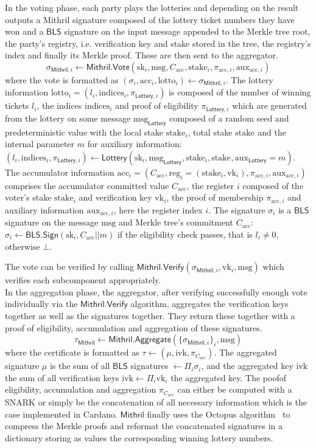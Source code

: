 \documentclass{article}
\newcommand{\vk}[1]{\ensuremath{\textrm{vk}_{#1}}\xspace}
\newcommand{\sk}[1]{\ensuremath{\textrm{sk}_{#1}}\xspace}
\newcommand{\m}{\ensuremath{\textrm{msg}}\xspace}
\newcommand{\acc}{\ensuremath{\textrm{acc}}\xspace}
\newcommand{\aux}{\ensuremath{\textrm{aux}}\xspace}
\newcommand{\reg}[1]{\ensuremath{\textrm{reg}_{#1}}\xspace}
\newcommand{\stake}[1]{\ensuremath{\textrm{stake}_{#1}}\xspace}
\newcommand{\lotto}[1]{\ensuremath{\textrm{lotto}_{#1}}\xspace}
\newcommand{\indices}[1]{\ensuremath{\textrm{indices}_{#1}}\xspace}
\newcommand{\ivk}{\ensuremath{\textrm{ivk}}\xspace}
\newcommand{\BLS}{\ensuremath{\mathsf{BLS}}\xspace}
\newcommand{\Mithril}{\ensuremath{\mathsf{Mithril}}\xspace}
\newcommand{\Lottery}{\ensuremath{\mathsf{Lottery}}\xspace}
\newcommand{\Vote}{\ensuremath{\mathsf{Vote}}\xspace}
\newcommand{\Sign}{\ensuremath{\mathsf{Sign}}\xspace}
\newcommand{\Verify}{\ensuremath{\mathsf{Verify}}\xspace}
\newcommand{\Aggregate}{\ensuremath{\mathsf{Aggregate}}\xspace}
\begin{document}
In the voting phase, each party plays the lotteries and depending on the result outputs a Mithril signature composed of the lottery ticket numbers they have won and a \BLS signature on the input message appended to the Merkle tree root, the party's registry, i.e. verification key and stake stored in the tree, the registry's index and finally its Merkle proof. These are then sent to the aggregator.
$$
\sigma_{\Mithril, i} \leftarrow \Mithril.\Vote(\sk{i}, \m, C_\acc, \stake{i}, \pi_{\acc, i}, \aux_{\acc, i})
$$
where the vote is formatted as $(\sigma_i, \acc_i, \lotto{i}) \leftarrow \sigma_{\Mithril, i}$.
%
The lottery information $\lotto{i} = (l_i, \indices{i}, \pi_{\Lottery, i})$ is composed of the number of winning tickets $l_i$, the indices $\indices{i}$ and proof of eligibility $\pi_{\Lottery, i}$ which are generated from the lottery on some message $\m_\Lottery$ composed of a random seed and predeterministic value with the local stake \stake{i}, total stake \stake{} and the internal parameter $m$ for auxiliary information: $(l_i, \indices{i}, \pi_{\Lottery,i})\leftarrow \Lottery(\sk{i}, \m_\Lottery, \stake{i}, \stake{}, \aux_\Lottery = m)$.
%
The accumulator information $\acc_i = (C_\acc, \reg{i} = (\stake{i}, \vk{i}), \pi_{\acc, i}, \aux_{\acc, i})$ comprises the accumulator committed value $C_\acc$, the register $i$ composed of the voter's stake \stake{i} and verification key \vk{i}, the proof of membership $\pi_{\acc, i}$ and auxiliary information $\aux_{\acc, i}$, here the register index $i$.
%
The signature $\sigma_i$ is a \BLS signature on the message $\m$ and Merkle tree's commitment $C_\acc$: $\sigma_i \leftarrow \BLS.\Sign(\sk{i}, C_\acc || m)$ if the eligibility check passes, that is $l_i \neq 0$, otherwise $\bot$.

The vote can be verified by calling $\Mithril.\Verify(\sigma_{\Mithril, i}, \vk{i}, \m)$ which verifies each subcomponent appropriately.\\


In the aggregation phase, the aggregator, after verifying successfully enough vote individually via the \Mithril.\Verify algorithm, aggregates the verification keys together as well as the signatures together. They return these together with a proof of eligibility, accumulation and aggregation of these signatures.
$$
\tau_\Mithril \leftarrow \Mithril.\Aggregate(\{\sigma_{\Mithril,i}\}_i, \m)
$$
where the certificate is formatted as $\tau \leftarrow (\mu, \ivk, \pi_{C_\acc})$.
%
The aggregated signature $\mu$ is the sum of all \BLS signatures $\leftarrow \Pi_i \sigma_i$, and the aggregated key $\ivk$ the sum of all verification keys $\ivk \leftarrow \Pi_i \vk{i}$ the aggregated key. The poofof eligibility, accumulation and aggregation $\pi_{C_\acc}$ can either be computed with a SNARK or simply be the concatenation of all necessary information which is the case implemented in Cardano.
%
\Mithril finally uses the Octopus algorithm~\cite{aumasson2018improving} to compress the Merkle proofs and reformat the concatenated signatures in a dictionary storing as values the corresponding winning lottery numbers.\\
\end{document}
